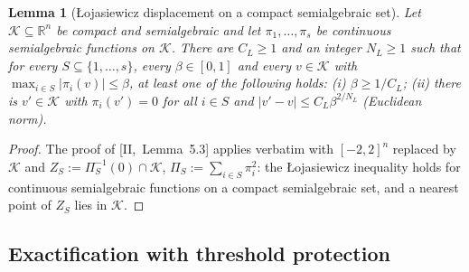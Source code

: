 \documentclass[10pt]{amsart}
\newtheorem{lemma}[theorem]{Lemma}
\theoremstyle{definition}
\theoremstyle{remark}
\newcommand{\R}{\mathbb R}
\begin{document}
\begin{lemma}[{\L}ojasiewicz displacement on a compact semialgebraic set]\label{lem:III-loj}
Let $\mathcal K\subseteq\R^n$ be compact and semialgebraic and let $\pi_1,\dots,
\pi_s$ be continuous semialgebraic functions on $\mathcal K$.  There are
$C_L\ge1$ and an integer $N_L\ge1$ such that for every $S\subseteq\{1,\dots,
s\}$, every $\beta\in[0,1]$ and every $v\in\mathcal K$ with $\max_{i\in S}
|\pi_i(v)|\le\beta$, at least one of the following holds: \textup{(i)} $\beta\ge
1/C_L$; \textup{(ii)} there is $v'\in\mathcal K$ with $\pi_i(v')=0$ for all $i\in
S$ and $|v'-v|\le C_L\beta^{2/N_L}$ \textup{(}Euclidean norm\textup{)}.
\end{lemma}

\begin{proof}
The proof of [II,~Lemma~5.3] applies verbatim with $[-2,2]^n$ replaced by
$\mathcal K$ and $Z_S:=\Pi_S^{-1}(0)\cap\mathcal K$, $\Pi_S:=\sum_{i\in S}\pi_i^2$:
the {\L}ojasiewicz inequality \cite[Corollary~2.6.7]{BCR} holds for continuous
semialgebraic functions on a compact semialgebraic set, and a nearest point
of $Z_S$ lies in $\mathcal K$.
\end{proof}

\subsection{Exactification with threshold protection}\label{subsec:III-KNtr}
\end{document}
